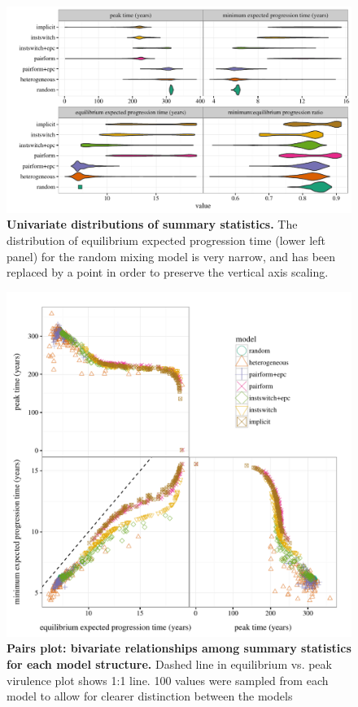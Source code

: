 \documentclass[10pt,letterpaper]{article}
\begin{document}
\begin{figure}[!ht]
\includegraphics[width=\textwidth]{../figures/fig3.pdf}
\caption{{\bf Univariate distributions of summary statistics.}
The distribution of equilibrium expected progression
time (lower left panel) for the random mixing model is very narrow, and has been replaced by a point in order to preserve the vertical axis scaling.}
\label{fig:unidist}
\end{figure}

\begin{figure}[!ht]
\includegraphics[width=\textwidth]{../figures/fig4.pdf}
\caption{{\bf Pairs plot: bivariate relationships among summary statistics for each model structure.}
Dashed line in equilibrium vs. peak virulence plot shows 1:1 line. 100 values were sampled from each model to allow for clearer distinction between the models}
\label{fig:pairplot}
\end{figure}
\end{document}
